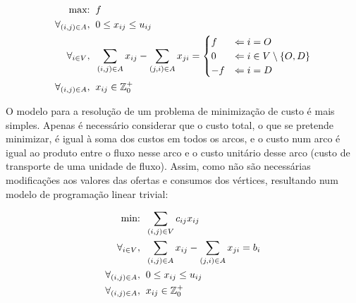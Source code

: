 \documentclass[12pt, a4paper, titlepage]{article}
\begin{document}
\begin{equation}
    \label{model-maximum-flow}
    \begin{split}
        \text{max:}             & \hspace{2mm} f \\
        \forall_{(i, j) \in A}, & \hspace{2mm} 0 \le x_{i j} \le u_{i j} \\
        \forall_{i \in V},      & \hspace{2mm}
            \sum_{(i, j) \in A} x_{i j} - \sum_{(j, i) \in A} x_{j i} =
            \begin{cases}
                f  & \Leftarrow i = O \\
                0  & \Leftarrow i \in V \setminus \{O, D\} \\
                -f & \Leftarrow i = D
            \end{cases} \\
        \forall_{(i, j) \in A}, & \hspace{2mm} x_{i j} \in \mathbb{Z}_0^+
    \end{split}
\end{equation}

O modelo para a resolução de um problema de minimização de custo é mais simples. Apenas é necessário
considerar que o custo total, o que se pretende minimizar, é igual à soma dos custos em todos os
arcos, e o custo num arco é igual ao produto entre o fluxo nesse arco e o custo unitário desse arco
(custo de transporte de uma unidade de fluxo). Assim, como não são necessárias modificações aos
valores das ofertas e consumos dos vértices, resultando num modelo de programação linear trivial:

\begin{equation}
    \label{model-minimum-cost}
    \begin{split}
        \text{min:}             & \hspace{2mm} \sum_{(i, j) \in V} c_{i j} x_{i j} \\
        \forall_{i \in V},      & \hspace{2mm}
            \sum_{(i, j) \in A} x_{i j} - \sum_{(j, i) \in A} x_{j i} = b_i \\
        \forall_{(i, j) \in A}, & \hspace{2mm} 0 \le x_{i j} \le u_{i j} \\
        \forall_{(i, j) \in A}, & \hspace{2mm} x_{i j} \in \mathbb{Z}_0^+
    \end{split}
\end{equation}
\end{document}
